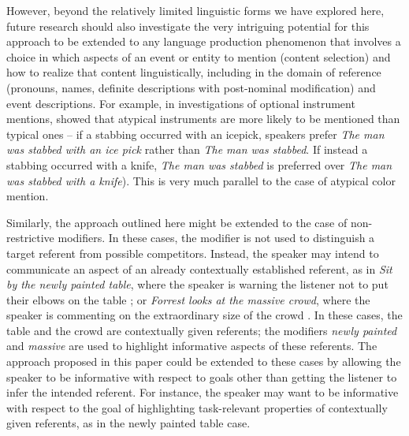 \documentclass[11pt]{article}
\begin{document}
However, beyond the relatively limited linguistic forms we have explored here, future research should also investigate the very intriguing potential for this approach to be extended to any language production phenomenon that involves a choice in which aspects of an event or entity to mention (content selection) and how to realize that content linguistically, including in the domain of reference (pronouns, names, definite descriptions with post-nominal modification) and event descriptions. For example, in investigations of optional instrument mentions,  showed that atypical instruments are more likely to be mentioned than typical ones -- if a stabbing occurred with an icepick, speakers prefer \emph{The man was stabbed with an ice pick} rather than \emph{The man was stabbed}. If instead a stabbing occurred with a knife, \emph{The man was stabbed} is preferred over \emph{The man was stabbed with a knife}). This is very much parallel to the case of atypical color mention. %

Similarly, the approach outlined here might be extended to the case of non-restrictive modifiers. In these cases, the modifier is not used to distinguish a target referent from possible competitors. Instead, the speaker may intend to communicate an aspect of an already contextually established referent, as in \emph{Sit by the newly painted table}, where the speaker is warning the listener not to put their elbows on the table \cite{dale1995}; or \emph{Forrest looks at the massive crowd}, where the speaker is commenting on the extraordinary size of the crowd \cite{Hahn2018}. In these cases, the table and the crowd are contextually given referents; the modifiers \emph{newly painted} and \emph{massive} are used to highlight informative aspects of these referents. The approach proposed in this paper could be extended to these cases by allowing the speaker to be informative with respect to goals other than getting the listener to infer the intended referent. For instance, the speaker may want to be informative with respect to the goal of highlighting task-relevant properties of contextually given referents, as in the newly painted table case. 
\end{document}
